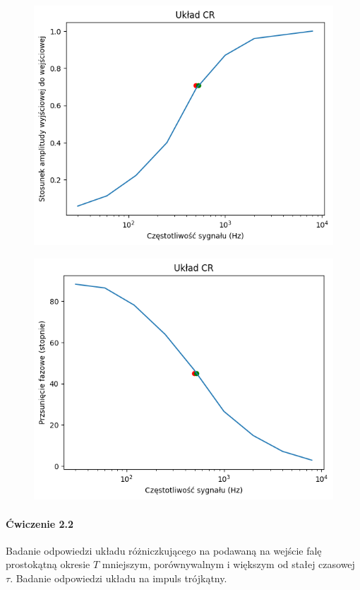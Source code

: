 \documentclass[14pt, table]{extarticle}
\begin{document}
\begin{figure}[H]
\includegraphics[scale=0.7]{D0}
\centering
\captionsetup{labelformat=empty}
\caption{}
\end{figure}

\begin{figure}[H]
\includegraphics[scale=0.7]{D1}
\centering
\captionsetup{labelformat=empty}
\caption{}
\end{figure}

\newpage
\paragraph{Ćwiczenie 2.2\\}
Badanie odpowiedzi układu różniczkującego na podawaną na wejście falę prostokątną okresie $T$ mniejszym, porównywalnym i większym od stałej czasowej $\tau$. Badanie odpowiedzi układu na impuls trójkątny. \\
\end{document}
